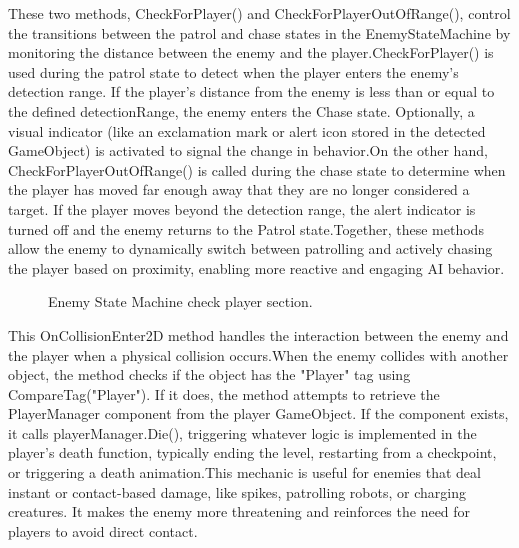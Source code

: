 \documentclass[12pt,oneside,openright,a4paper]{cpe-english-project}
\begin{document}
\newpage
These two methods, CheckForPlayer() and CheckForPlayerOutOfRange(), control the transitions between the patrol and chase states in the EnemyStateMachine by monitoring the distance between the enemy and the player.CheckForPlayer() is used during the patrol state to detect when the player enters the enemy's detection range. If the player’s distance from the enemy is less than or equal to the defined detectionRange, the enemy enters the Chase state. Optionally, a visual indicator (like an exclamation mark or alert icon stored in the detected GameObject) is activated to signal the change in behavior.On the other hand, CheckForPlayerOutOfRange() is called during the chase state to determine when the player has moved far enough away that they are no longer considered a target. If the player moves beyond the detection range, the alert indicator is turned off and the enemy returns to the Patrol state.Together, these methods allow the enemy to dynamically switch between patrolling and actively chasing the player based on proximity, enabling more reactive and engaging AI behavior.\par
 \begin{figure}[!h]
 \centering
\caption{Enemy State Machine check player section.}\label{fig:ESMcp}
\end{figure}
This OnCollisionEnter2D method handles the interaction between the enemy and the player when a physical collision occurs.When the enemy collides with another object, the method checks if the object has the "Player" tag using CompareTag("Player"). If it does, the method attempts to retrieve the PlayerManager component from the player GameObject. If the component exists, it calls playerManager.Die(), triggering whatever logic is implemented in the player's death function, typically ending the level, restarting from a checkpoint, or triggering a death animation.This mechanic is useful for enemies that deal instant or contact-based damage, like spikes, patrolling robots, or charging creatures. It makes the enemy more threatening and reinforces the need for players to avoid direct contact.\par
\end{document}
